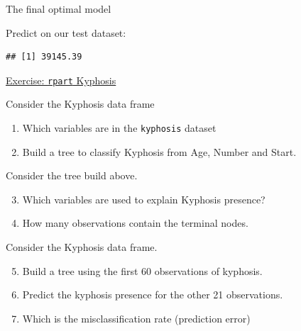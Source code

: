 \documentclass[
  10pt,
  ignorenonframetext,
]{beamer}
\newenvironment{Shaded}{}{}
\newcommand{\DataTypeTok}[1]{#1}
\newcommand{\KeywordTok}[1]{\textcolor[rgb]{0.00,0.00,1.00}{#1}}
\newcommand{\NormalTok}[1]{#1}
\newcommand{\OperatorTok}[1]{#1}
\providecommand{\tightlist}{%
  \setlength{\itemsep}{0pt}\setlength{\parskip}{0pt}}
\begin{document}
\begin{frame}[fragile]{The final optimal model}
\begin{block}{Predict on our test dataset:}
\begin{Shaded}
\end{Shaded}

\begin{verbatim}
## [1] 39145.39
\end{verbatim}

\end{block}

\end{frame}

\begin{frame}[fragile]{\href{https://www.r-exercises.com/2016/12/13/recursive-partitioning-and-regression-trees-exercises/}{Exercise:
\texttt{rpart} Kyphosis}}
\protect\hypertarget{exercise-rpart-kyphosis}{}

\begin{block}{Consider the Kyphosis data frame}

\begin{enumerate}
[1)]
\tightlist
\item
  Which variables are in the \texttt{kyphosis} dataset
\item
  Build a tree to classify Kyphosis from Age, Number and Start.
\end{enumerate}

\end{block}

\begin{block}{Consider the tree build above.}

\begin{enumerate}
[1)]
\setcounter{enumi}{2}
\tightlist
\item
  Which variables are used to explain Kyphosis presence?
\item
  How many observations contain the terminal nodes.
\end{enumerate}

\end{block}

\begin{block}{Consider the Kyphosis data frame.}

\begin{enumerate}
[1)]
\setcounter{enumi}{4}
\tightlist
\item
  Build a tree using the first 60 observations of kyphosis.
\item
  Predict the kyphosis presence for the other 21 observations.
\item
  Which is the misclassification rate (prediction error)
\end{enumerate}

\end{block}

\end{frame}
\end{document}
